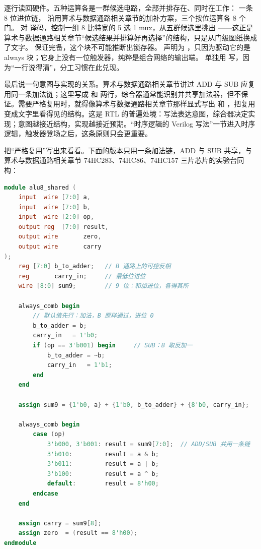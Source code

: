 逐行读回硬件。五种运算各是一群候选电路，全部并排存在、同时在工作： 一条 8 位进位链， 沿用算术与数据通路相关章节的加补方案，三个按位运算各 8 个门。 对  译码，控制一组 8 比特宽的 5 选 1 mux，从五群候选里挑出 ——这正是算术与数据通路相关章节“候选结果并排算好再选择”的结构，只是从门级图纸换成了文字。 保证完备，这个块不可能推断出锁存器。 声明为 ，只因为驱动它的是 always 块；它身上没有一位触发器，纯粹是组合网络的输出端。 单独用  写，因为“一行说得清”，分工习惯在此兑现。

最后说一句意图与实现的关系。算术与数据通路相关章节讲过 ADD 与 SUB 应复用同一条加法链；这里写成  和  两行，综合器通常能识别并共享加法器，但不保证。需要严格复用时，就得像算术与数据通路相关章节那样显式写出  和 ，把复用变成文字里看得见的结构。这是 RTL 的普遍处境：写法表达意图，综合器决定实现；意图越接近结构，实现越接近预期。“时序逻辑的 Verilog 写法”一节进入时序逻辑，触发器登场之后，这条原则只会更重要。

把“严格复用”写出来看看。下面的版本只用一条加法链，ADD 与 SUB 共享，与算术与数据通路相关章节 74HC283、74HC86、74HC157 三片芯片的实验台同构：

\begin{lstlisting}[language=Verilog]
module alu8_shared (
    input  wire [7:0] a,
    input  wire [7:0] b,
    input  wire [2:0] op,
    output reg  [7:0] result,
    output wire       zero,
    output wire       carry
);
    reg [7:0] b_to_adder;   // B 通路上的可控反相
    reg       carry_in;     // 最低位进位
    wire [8:0] sum9;        // 9 位：和加进位，各得其所

    always_comb begin
        // 默认值先行：加法，B 原样通过，进位 0
        b_to_adder = b;
        carry_in   = 1'b0;
        if (op == 3'b001) begin     // SUB：B 取反加一
            b_to_adder = ~b;
            carry_in   = 1'b1;
        end
    end

    assign sum9 = {1'b0, a} + {1'b0, b_to_adder} + {8'b0, carry_in};

    always_comb begin
        case (op)
            3'b000, 3'b001: result = sum9[7:0];  // ADD/SUB 共用一条链
            3'b010:         result = a & b;
            3'b011:         result = a | b;
            3'b100:         result = a ^ b;
            default:        result = 8'h00;
        endcase
    end

    assign carry = sum9[8];
    assign zero  = (result == 8'h00);
endmodule
\end{lstlisting}

